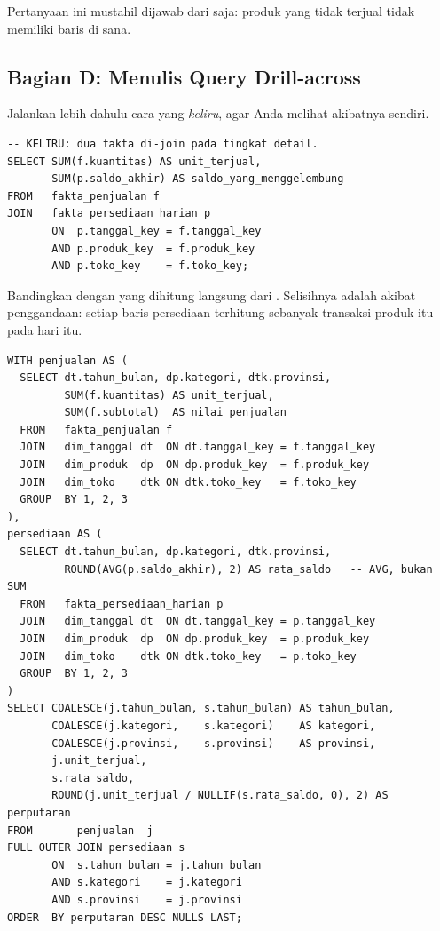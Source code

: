 Pertanyaan ini mustahil dijawab dari  saja: produk
yang tidak terjual tidak memiliki baris di sana.

\subsection{Bagian D: Menulis Query Drill-across}


Jalankan lebih dahulu cara yang \emph{keliru}, agar Anda melihat akibatnya
sendiri.

\begin{lstlisting}[style=sqlgaya]
-- KELIRU: dua fakta di-join pada tingkat detail.
SELECT SUM(f.kuantitas) AS unit_terjual,
       SUM(p.saldo_akhir) AS saldo_yang_menggelembung
FROM   fakta_penjualan f
JOIN   fakta_persediaan_harian p
       ON  p.tanggal_key = f.tanggal_key
       AND p.produk_key  = f.produk_key
       AND p.toko_key    = f.toko_key;
\end{lstlisting}

Bandingkan  dengan
 yang dihitung langsung dari
. Selisihnya adalah akibat penggandaan:
setiap baris persediaan terhitung sebanyak transaksi produk itu pada hari itu.


\begin{lstlisting}[style=sqlgaya]
WITH penjualan AS (
  SELECT dt.tahun_bulan, dp.kategori, dtk.provinsi,
         SUM(f.kuantitas) AS unit_terjual,
         SUM(f.subtotal)  AS nilai_penjualan
  FROM   fakta_penjualan f
  JOIN   dim_tanggal dt  ON dt.tanggal_key = f.tanggal_key
  JOIN   dim_produk  dp  ON dp.produk_key  = f.produk_key
  JOIN   dim_toko    dtk ON dtk.toko_key   = f.toko_key
  GROUP  BY 1, 2, 3
),
persediaan AS (
  SELECT dt.tahun_bulan, dp.kategori, dtk.provinsi,
         ROUND(AVG(p.saldo_akhir), 2) AS rata_saldo   -- AVG, bukan SUM
  FROM   fakta_persediaan_harian p
  JOIN   dim_tanggal dt  ON dt.tanggal_key = p.tanggal_key
  JOIN   dim_produk  dp  ON dp.produk_key  = p.produk_key
  JOIN   dim_toko    dtk ON dtk.toko_key   = p.toko_key
  GROUP  BY 1, 2, 3
)
SELECT COALESCE(j.tahun_bulan, s.tahun_bulan) AS tahun_bulan,
       COALESCE(j.kategori,    s.kategori)    AS kategori,
       COALESCE(j.provinsi,    s.provinsi)    AS provinsi,
       j.unit_terjual,
       s.rata_saldo,
       ROUND(j.unit_terjual / NULLIF(s.rata_saldo, 0), 2) AS perputaran
FROM       penjualan  j
FULL OUTER JOIN persediaan s
       ON  s.tahun_bulan = j.tahun_bulan
       AND s.kategori    = j.kategori
       AND s.provinsi    = j.provinsi
ORDER  BY perputaran DESC NULLS LAST;
\end{lstlisting}

